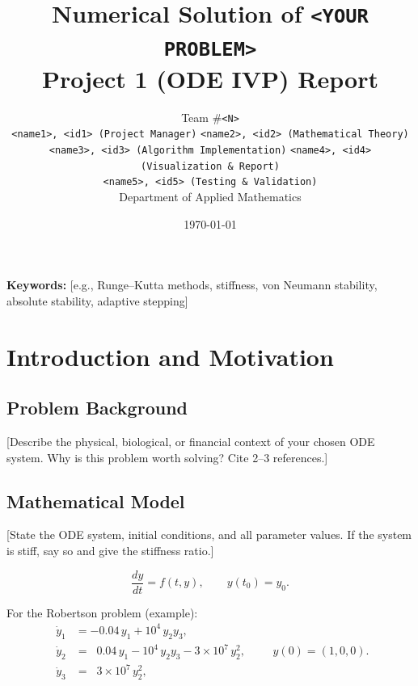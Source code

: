 \documentclass[11pt,a4paper]{article}
\title{\textbf{Numerical Solution of \texttt{<YOUR PROBLEM>}}\\[2mm]
\large Project 1 (ODE IVP) Report}
\author{
    Team \#\texttt{<N>} \\
    \small \texttt{<name1>, <id1> (Project Manager)} \quad
    \texttt{<name2>, <id2> (Mathematical Theory)} \\
    \small \texttt{<name3>, <id3> (Algorithm Implementation)} \quad
    \texttt{<name4>, <id4> (Visualization \& Report)} \\
    \small \texttt{<name5>, <id5> (Testing \& Validation)} \\
    \small Department of Applied Mathematics
}
\date{\today}
\theoremstyle{definition}
\theoremstyle{remark}
\begin{document}
\maketitle

\begin{abstract}
\end{abstract}

\noindent\textbf{Keywords:} [e.g., Runge--Kutta methods, stiffness, von Neumann
stability, absolute stability, adaptive stepping]

\tableofcontents
\newpage

\section{Introduction and Motivation}

\subsection{Problem Background}
[Describe the physical, biological, or financial context of your chosen ODE
system. Why is this problem worth solving? Cite 2--3 references.]

\subsection{Mathematical Model}
[State the ODE system, initial conditions, and all parameter values. If the
system is stiff, say so and give the stiffness ratio.]

\begin{equation}
    \frac{dy}{dt} = f(t, y), \qquad y(t_0) = y_0.
    \label{eq:ivp}
\end{equation}

For the Robertson problem (example):
\begin{equation}
\begin{aligned}
    \dot{y}_1 &= -0.04\, y_1 + 10^4\, y_2 y_3, \\
    \dot{y}_2 &= \;\;0.04\, y_1 - 10^4\, y_2 y_3 - 3\times 10^7\, y_2^2, \\
    \dot{y}_3 &= \;\;3\times 10^7\, y_2^2,
\end{aligned}
\qquad y(0) = (1, 0, 0).
\label{eq:robertson}
\end{equation}
\end{document}
